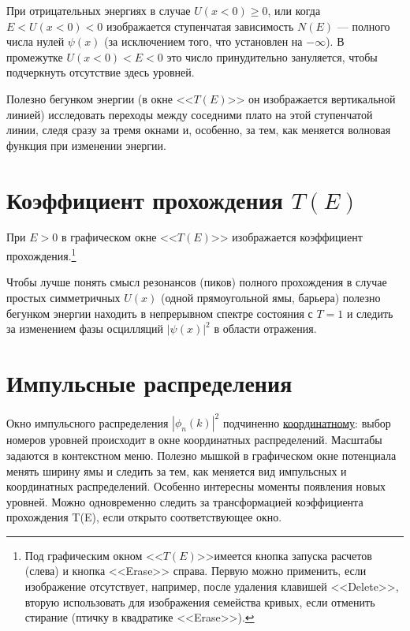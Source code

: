 \documentclass[12pt]{article}
\begin{document}
При отрицательных энергиях в случае $U(x<0)\ge0$, или когда $E<U(x<0)<0$
изображается ступенчатая зависимость $N(E)$ --- полного числа нулей $\psi(x)$
(за исключением того, что установлен на $-\infty$).
В промежутке $U(x<0)<E<0$ это число принудительно зануляется, чтобы подчеркнуть отсутствие здесь уровней.

Полезно бегунком энергии (в окне <<$T(E)$>> он изображается вертикальной линией)
исследовать переходы между соседними плато на  этой ступенчатой линии, следя
сразу за тремя окнами и, особенно, за тем, как меняется волновая функция
при изменении энергии.

\hypertarget{PsiandTE}{}\section[Коэффициент прохождения]{Коэффициент прохождения $T(E)$}
При $E>0$ в графическом окне <<$T(E)$>> изображается коэффициент прохождения.\footnote[9]{Под графическим окном <<$T(E)$>>имеется кнопка запуска расчетов (слева) и кнопка <<Erase>> справа.
Первую можно применить, если изображение отсутствует, например, после удаления клавишей <<Delete>>,
вторую использовать для изображения семейства кривых, если отменить стирание
(птичку в квадратике <<Erase>>).}

Чтобы лучше понять смысл резонансов (пиков) полного прохождения в случае простых
симметричных $U(x)$ (одной прямоугольной ямы, барьера) полезно бегунком энергии
находить в непрерывном спектре состояния с $T=1$ и следить за изменением фазы
осцилляций $|\psi(x)|^2$ в области отражения.

\hypertarget{phin}{}\section{Импульсные распределения}
Окно импульсного распределения $|\phi_n(k)|^2$ подчиненно
\hyperlink{psinx}{координатному}: выбор номеров уровней происходит
в окне координатных распределений. Масштабы задаются в контекстном меню.
Полезно мышкой в графическом окне потенциала менять ширину ямы и следить за тем, как меняется вид импульсных и
координатных распределений. Особенно интересны моменты появления новых уровней.
Можно одновременно следить за трансформацией коэффициента прохождения T(E), если открыто соответствующее окно.
\end{document}
